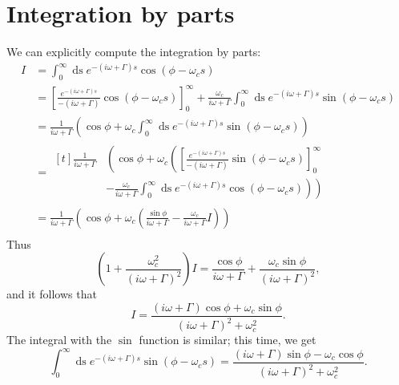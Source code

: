 \documentclass[12pt]{article}
\begin{document}
\section{Integration by parts}
We can explicitly compute the integration by parts:
\begin{align}
	I &= \int_0^{\infty}\mathop{ds} e^{-(i\omega + \Gamma)s} \cos{(\phi - \omega_c s)} \\
	&= \left[ \frac{e^{-(i\omega + \Gamma)s}}{-(i\omega + \Gamma)} \cos{(\phi - \omega_c s)} \right]_{0}^{\infty} + \frac{\omega_c}{i\omega + \Gamma} \int_0^{\infty}\mathop{ds} e^{-(i\omega + \Gamma)s} \sin{(\phi - \omega_c s)} \\
	&= \frac{1}{i\omega + \Gamma}\left(\cos{\phi} + \omega_c \int_0^{\infty}\mathop{ds} e^{-(i\omega + \Gamma)s} \sin{(\phi - \omega_c s)}\right) \\
	&= \begin{aligned}[t]\frac{1}{i\omega + \Gamma}&\left(\cos{\phi} + \omega_c \left(\left[\frac{e^{-(i\omega + \Gamma)s}}{-(i\omega + \Gamma)} \sin{(\phi - \omega_c s)} \right]_{0}^{\infty}\right.\right. \\
		&\left.\left.-\frac{\omega_c}{i\omega + \Gamma}\int_0^{\infty}\mathop{ds} e^{-(i\omega + \Gamma)s} \cos{(\phi - \omega_c s)}\right) \right) \end{aligned}\\
	& = \frac{1}{i\omega + \Gamma}\left(\cos{\phi} + \omega_c \left(\frac{\sin\phi}{i\omega + \Gamma}-\frac{\omega_c}{i\omega + \Gamma} I\right) \right)\\
\end{align}
Thus
\begin{equation}
	\left(1+ \frac{\omega_c^2}{(i\omega + \Gamma)^2}\right)I = \frac{\cos{\phi}}{i\omega + \Gamma}+\frac{\omega_c\sin\phi}{(i\omega + \Gamma)^2},
\end{equation}
and it follows that
\begin{equation}
	I = \frac{(i\omega + \Gamma)\cos{\phi}+\omega_c\sin\phi}{(i\omega + \Gamma)^2 + \omega_c^2}.
\end{equation}
The integral with the $\sin$ function is similar; this time, we get
\begin{equation}
	\int_0^{\infty}\mathop{ds} e^{-(i\omega + \Gamma)s} \sin{(\phi - \omega_c s)} = \frac{(i\omega + \Gamma)\sin{\phi}-\omega_c\cos\phi}{(i\omega + \Gamma)^2 + \omega_c^2}.
\end{equation}
\end{document}

